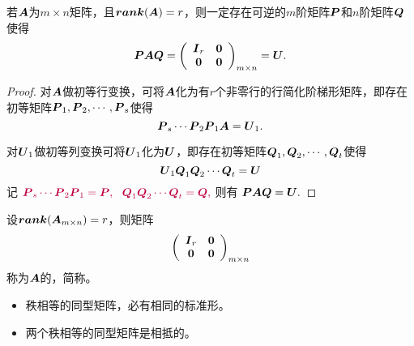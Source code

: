 \begin{frame}
\begin{dingli}
  若$\MA$为$m\times n$矩阵，且$\rank(\MA)=r$，则一定存在可逆的$m$阶矩阵$\MP$和$n$阶矩阵$\MQ$使得
  $$
  \MP\MA\MQ=\left(
    \begin{array}{cc}
      \MI_r&\M0\\
      \M0&\M0
    \end{array}
  \right)_{m\times n} = \MU.
  $$
\end{dingli}\pause 
\begin{proof}
对$\MA$做初等行变换，可将$\MA$化为有$r$个非零行的行简化阶梯形矩阵，即存在初等矩阵$\MP_1,\MP_2,\cd,\MP_s$使得
$$
\MP_s\cd\MP_2\MP_1\MA=\MU_1.
$$

对$\MU_1$做初等列变换可将$\MU_1$化为$\MU$，即存在初等矩阵$\MQ_1,\MQ_2,\cd,\MQ_t$使得
$$
\MU_1\MQ_1\MQ_2\cd\MQ_t=\MU
$$
记
$
\purple{\MP_s\cd\MP_2\MP_1=\MP, ~~\MQ_1\MQ_2\cd\MQ_t=\MQ,}
$
则有
$
\MP\MA\MQ=\MU.
$
\end{proof}
\end{frame}

\begin{frame}
\begin{dingyi}[相抵标准形]
  设$\rank(\MA_{m\times n})=r$，则矩阵
  $$
  \left(
    \begin{array}{cc}
      \MI_r&\M0\\
      \M0&\M0
    \end{array}
  \right)_{m\times n} 
  $$称为$\MA$的，简称。
\end{dingyi}
\begin{itemize}
\item 秩相等的同型矩阵，必有相同的标准形。
\item 两个秩相等的同型矩阵是相抵的。
\end{itemize}

\end{frame}

